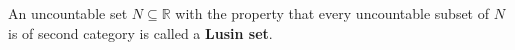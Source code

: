 An uncountable set $N \subseteq \mathbb{R}$ with the property that every uncountable subset of $N$ is of second category is called a \textbf{Lusin set}.
